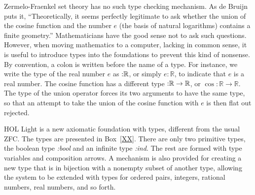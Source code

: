 \documentclass{llncs}
\def\tc{\hbox{:}}
\newcommand{\ring}[1]{\mathbb{#1}}
\begin{document}
Zermelo-Fraenkel set theory has no such type checking mechanism.  As de Bruijn
puts it,
``Theoretically, it seems perfectly legitimate
to ask whether the union of the cosine function
and the number $e$ (the basis of natural
logarithms) contains a finite geometry.''
Mathematicians have the good sense not to ask such questions.  However, when moving
mathematics to a computer, lacking in common sense, it is useful to introduce types
into the foundations
to prevent this kind of nonsense.  By convention,  a colon is written before the name of a type.  For instance, we write the type of the real number $e$ as $\tc\ring{R}$, or simply $e:\ring{R}$, to indicate that $e$ is a real number.
The cosine function has a different type $\tc\ring{R}\to\ring{R}$,
or $\cos:\ring{R}\to\ring{R}$.
The type of the union operator 
forces its two arguments to have the same type,
so that an attempt to take the union of the cosine function with $e$ is then flat out rejected.

HOL Light is a new axiomatic foundation with types, 
 different from the usual ZFC.
The types are presented in Box~\ref{XX}.  There are only two primitive
types, the boolean type {\it \tc bool} and an infinite type {\it \tc ind}. The rest are formed
with type variables and composition arrows.
A mechanism is also provided for creating a new type
that is in bijection with a nonempty subset of another type,
allowing the system
to be extended with types for ordered pairs, integers, rational numbers, real numbers,
and so forth.
\end{document}
